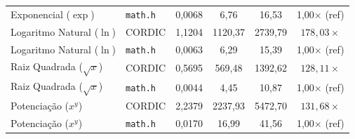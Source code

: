 \begin{table}[htbp]
{\begin{tabular}{llcccc}
Exponencial ($\exp$) & \texttt{math.h} & 0,0068 & 6,76 & 16,53 & 1{,}00$\times$ (ref) \\
Logaritmo Natural ($\ln$) & CORDIC & 1,1204 & 1120,37 & 2739,79 & $178,03\times$ \\
Logaritmo Natural ($\ln$) & \texttt{math.h} & 0,0063 & 6,29 & 15,39 & 1{,}00$\times$ (ref) \\
Raiz Quadrada ($\sqrt{x}$) & CORDIC & 0,5695 & 569,48 & 1392,62 & $128,11\times$ \\
Raiz Quadrada ($\sqrt{x}$) & \texttt{math.h} & 0,0044 & 4,45 & 10,87 & 1{,}00$\times$ (ref) \\
Potenciação ($x^y$) & CORDIC & 2,2379 & 2237,93 & 5472,70 & $131,68\times$ \\
Potenciação ($x^y$) & \texttt{math.h} & 0,0170 & 16,99 & 41,56 & 1{,}00$\times$ (ref) \\
\hline
\end{tabular}%
}
\end{table}